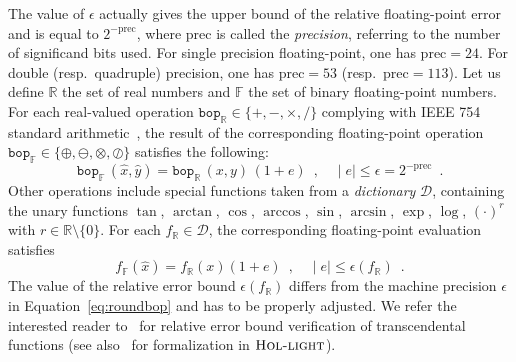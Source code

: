 \documentclass[preprint]{sigplanconf}
\newcommand{\setD}{\mathcal{D}} %
\newcommand{\R}{\mathbb{R}}
\newcommand{\F}{\mathbb{F}}
\renewcommand{\prec}{\text{prec}}
\newcommand{\hol}{\text{\sc Hol-light}}
\newcommand{\bop}{\mathtt{bop}}
\theoremstyle{plain}
\begin{document}
The value of $\epsilon$ actually gives the upper bound of the relative floating-point error and is equal to $2^{-\prec}$, where $\prec$ is called the {\em precision}, referring to the number of significand bits used. For single precision floating-point, one has $\prec = 24$. For double (resp.~quadruple) precision, one has $\prec = 53$ (resp.~$\prec=113$). Let us define $\R$ the set of real numbers and $\F$ the set of binary floating-point numbers.
For each real-valued operation $\bop_\R \in \{+, -, \times, \slash \}$ complying with IEEE 754 standard arithmetic~\cite{IEEE}, the result of the corresponding floating-point operation $\bop_\F \in \{\oplus, \ominus, \otimes, \oslash \}$ satisfies the following:
\begin{equation}
\label{eq:roundbop}
\bop_\F \, (\hat{x}, \hat{y}) = \bop_\R \, (x, y) \, (1 + e) \enspace, \quad \mid e \mid \leq \epsilon = 2^{-\prec} \enspace.
\end{equation}
%
Other operations include special functions taken from a {\em dictionary} $\setD$, containing the unary functions
$\tan$, $\arctan$, $\cos$, $\arccos$, $\sin$, $\arcsin$, $\exp$, $\log$, $(\cdot)^{r}$ with $r\in \R\setminus\{0\}$. For each $f_\R \in \setD$, the corresponding floating-point evaluation satisfies 
\begin{equation}
\label{eq:roundtransc}
f_\F (\hat{x}) = f_\R (x) (1 + e) \enspace, \quad \mid e \mid \leq \epsilon (f_\R) \enspace.
\end{equation}
The value of the relative error bound $\epsilon (f_\R)$ differs from the machine precision $\epsilon$ in Equation~\eqref{eq:roundbop} and has to be properly adjusted. We refer the interested reader to~\cite{VerifCADTransc} for relative error bound verification of transcendental functions (see also~\cite{VerifHOLTransc} for formalization in $\hol$).
%
\end{document}
